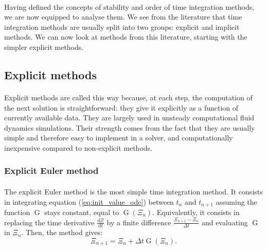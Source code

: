       \paragraph{}
      Having defined the concepts of stability and order of time integration methods, we are now equipped to analyse them.
      We see from the literature that time integration methods are usually split into two groups: explicit and implicit methods.
      We can now look at methods from this literature, starting with the simpler explicit methods.


    \pagebreak
    \subsection{Explicit methods}

      \paragraph{}
      Explicit methods are called this way because, at each step, the computation of the next solution is straightforward: they give it explicitly as a function of currently available data.
      They are largely used in unsteady computational fluid dynamics simulations.
      Their strength comes from the fact that they are usually simple and therefore easy to implement in a solver, and computationally inexpensive compared to non-explicit methods.


      \subsubsection{Explicit Euler method}

        \paragraph{}
        The explicit Euler method is the most simple time integration method.
        It consists in integrating equation (\ref{eq:init_value_ode}) between $t_n$ and $t_{n+1}$ assuming the function $\operatorname{G}$ stays constant, equal to $\operatorname{G}\left(\Xi_n\right)$.
        Equivalently, it consists in replacing the time derivative $\frac{\mathrm{d} \Xi}{\mathrm{d} t}$ by a finite difference $\frac{\Xi_{n+1} - \Xi_n}{\Delta t}$ and evaluating $\operatorname{G}$ in $\Xi_n$.
        Then, the method gives:
        \begin{equation}
          \Xi_{n+1} = \Xi_n + \Delta t \operatorname{G}\left(\Xi_n\right) .
        \end{equation}

